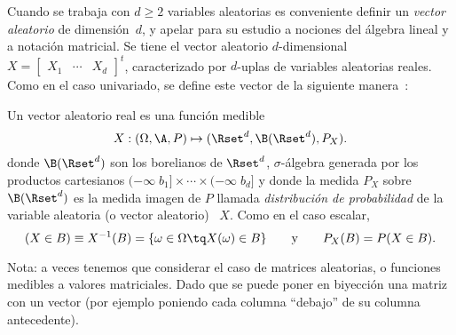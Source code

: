 Cuando se trabaja  con $d \ge 2$ variables aleatorias  es conveniente definir un
{\it vector aleatorio}  de dimensi\'on~$d$, y apelar para  su estudio a nociones
del \'algebra  lineal y  a notaci\'on matricial.   Se tiene el  vector aleatorio
$d$-dimensional  \ $X  = \begin{bmatrix}  X_1 &  \cdots &  X_d \end{bmatrix}^t$,
caracterizado por  $d$-uplas de  variables aleatorias reales.   Como en  el caso
univariado,  se  define  este  vector  de  la  siguiente  manera~\cite{AshDol99,
  AthLah06, Coh13, Bre88}:
%
\begin{definicion}
\label{Def:MP:VectorAleatorioReal}
%
  Un vector aleatorio real es una funci\'on medible
  \[
  X: (\Omega,\A,P) \mapsto (\Rset^d,\B(\Rset^d),P_X).
  \]
  donde  $\B(\Rset^d)$  son  los  borelianos  de  $\Rset^d$,  $\sigma$-\'algebra
  generada por los productos cartesianos  $(-\infty \; b_1] \times \cdots \times
  (-\infty \;  b_d]$ y donde  la medida $P_X$  sobre $\B(\Rset^d)$ es  la medida
  imagen  de $P$  llamada {\it  distribuci\'on de  probabilidad} de  la variable
  aleatoria (o  vector aleatorio)  \ $X$. Como  en el caso  escalar, 
 \[
 (X \in B) \equiv X^{-1}(B) = \{ \omega \in \Omega \tq X(\omega) \in B \} \qquad
 \mbox{y} \qquad P_X(B) = P(X \in B).
 \]
\end{definicion}
%
\noindent Nota: a veces tenemos que considerar el caso de matrices aleatorias, o
funciones  medibles  a  valores  matriciales.    Dado  que  se  puede  poner  en
biyecci\'on  una  matriz  con  un  vector (por  ejemplo  poniendo  cada  columna
``debajo''  de  su columna  antecedente).  

\


